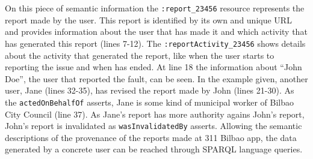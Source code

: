 On this piece of semantic information the \texttt{:report\_23456} resource represents the report made by the user. This report is identified by its own and unique URL and provides information about the user that has made it and which activity that has generated this report (lines 7-12). The \texttt{:reportActivity\_23456} shows details about the activity that generated the report, like when the user starts to reporting the issue and when has ended. At line 18 the information about ``John Doe'', the user that reported the fault, can be seen. In the example given, another user, Jane (lines 32-35), has revised the report made by John (lines 21-30). As the \texttt{actedOnBehalfOf} asserts, Jane is some kind of municipal worker of Bilbao City Council (line 37). As Jane's report has more authority agains John's report, John's report is invalidated as \texttt{wasInvalidatedBy} asserts. Allowing the semantic descriptions of the provenance of the reports made at 311 Bilbao app, the data generated by a concrete user can be reached through SPARQL \cite{prudhommeaux_sparql_2008} language queries.